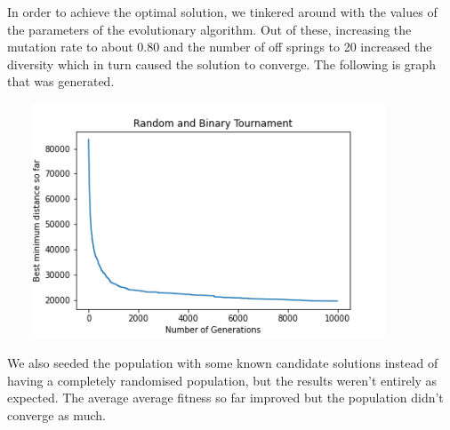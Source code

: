 \documentclass[a4paper]{article}
\begin{document}
In order to achieve the optimal solution, we tinkered around with the values of the parameters of the evolutionary algorithm. Out of these, increasing the mutation rate to about 0.80 and the number of off springs to 20  increased the diversity which in turn caused the solution to converge. The following is graph that was generated. 
\begin{center}
\includegraphics[width=12cm, height=7cm]{Graphs/TSP/rand_bt_bsf.png} \\
\end{center}


We also seeded the population with some known candidate solutions instead of having a completely randomised population, but the results weren't entirely as expected. The average average fitness so far improved but the population didn't converge as much. \newline
\end{document}

